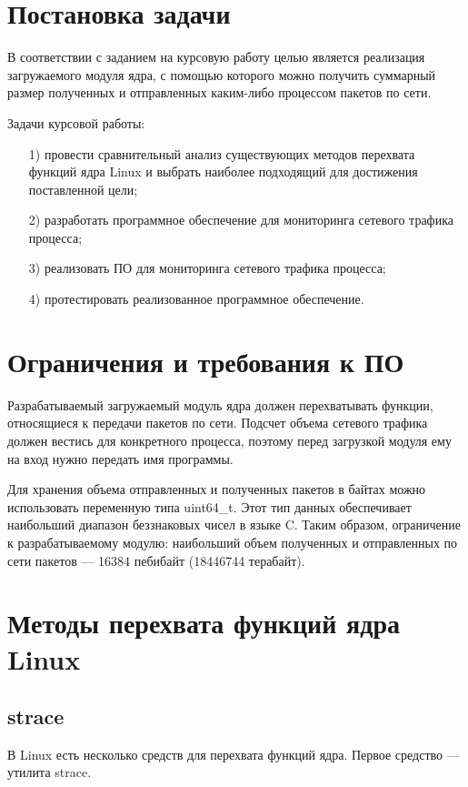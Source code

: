 \documentclass{bmstu}
\begin{document}
\section{Постановка задачи}

В соответствии с заданием на курсовую работу целью является реализация загружаемого модуля ядра, с помощью которого можно получить суммарный размер полученных и отправленных каким-либо процессом пакетов по сети.

Задачи курсовой работы:
\begin{enumerate}
\item[1)] провести сравнительный анализ существующих методов перехвата функций ядра Linux и выбрать наиболее подходящий для достижения поставленной цели;
\item[2)] разработать программное обеспечение для мониторинга сетевого трафика процесса;
\item[3)] реализовать ПО для мониторинга сетевого трафика процесса;
\item[4)] протестировать реализованное программное обеспечение.
\end{enumerate}

\section{Ограничения и требования к ПО}

Разрабатываемый загружаемый модуль ядра должен перехватывать функции, относящиеся к передачи пакетов по сети. 
Подсчет объема сетевого трафика должен вестись для конкретного процесса, поэтому перед загрузкой модуля ему на вход нужно передать имя программы.

Для хранения объема отправленных и полученных пакетов в байтах можно использовать переменную типа uint64\_t. 
Этот тип данных обеспечивает наибольший диапазон беззнаковых чисел в языке C. 
Таким образом, ограничение к разрабатываемому модулю: наибольший объем полученных и отправленных по сети пакетов --- 16384 пебибайт (18446744 терабайт).

\pagebreak
\section{Методы перехвата функций ядра Linux}

\subsection{strace}

В Linux есть несколько средств для перехвата функций ядра. 
Первое средство --- утилита strace.
\end{document}
